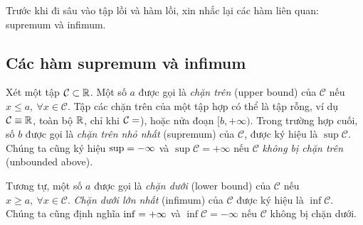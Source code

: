 Trước khi đi sâu vào tập lồi và hàm lồi, xin nhắc lại các hàm liên quan: supremum và infimum.

\subsection{Các hàm supremum và infimum}

\def\CC{\mathcal{C}}
Xét một tập $\mathcal{C} \subset \mathbb{R}$. Một số $a$ được gọi là \textit{chặn trên} (upper bound) của $\CC$ nếu   $x \leq a, ~ \forall x \in \CC$. Tập các chặn trên của một tập hợp có thể là tập rỗng, ví dụ $\CC \equiv \R$, toàn bộ $\mathbb{R}$, chỉ khi $\CC = \empty$), hoặc nửa đoạn $[b, +\infty)$. Trong trường hợp cuối, số $b$ được gọi là \textit{chặn trên nhỏ nhất} (supremum) của $\CC$, được ký hiệu là $\sup \CC$. Chúng ta cũng ký hiệu $\sup \empty = -\infty$ và $\sup \CC = +\infty$ nếu $\CC$ \textit{không bị chặn trên} (unbounded above).

Tương tự, một số $a$ được gọi là \textit{chặn dưới} (lower bound) của $\CC$ nếu $x \geq a, ~\forall x \in \CC$. \textit{Chặn dưới lớn nhất} (infimum) của $\CC$ được ký hiệu là $\inf \CC$. Chúng ta cũng định nghĩa $\inf \empty = +\infty$ và $\inf \CC  = -\infty$ nếu $\CC$ không bị chặn dưới.

